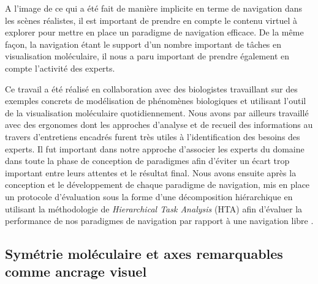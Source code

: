 

A l'image de ce qui a été fait de manière implicite en terme de navigation dans les scènes réalistes, il est  important de prendre en compte le contenu virtuel à explorer pour mettre en place un paradigme de navigation efficace. De la même façon, la navigation étant le support d'un nombre important de tâches en visualisation moléculaire, il nous a paru important de prendre également en compte l'activité des experts. 


Ce travail a été réalisé en collaboration avec des biologistes travaillant sur des exemples concrets de modélisation de phénomènes biologiques et utilisant l'outil de la visualisation moléculaire quotidiennement. Nous avons par ailleurs travaillé avec des ergonomes dont les approches d'analyse et de recueil des informations au travers d'entretiens encadrés furent très utiles à l'identification des besoins des experts. Il fut important dans notre approche d'associer les experts du domaine dans toute la phase de conception de paradigmes afin d'éviter un écart trop important entre leurs attentes et le résultat final. Nous avons ensuite après la conception et le développement de chaque paradigme de navigation, mis en place un protocole d'évaluation sous la forme d'une décomposition hiérarchique en utilisant la méthodologie de \textit{Hierarchical Task Analysis} (HTA) afin d'évaluer la performance de nos paradigmes de navigation par rapport à une navigation libre \cite{annett2003hierarchical}.

\subsection{Symétrie moléculaire et axes remarquables comme ancrage visuel}


